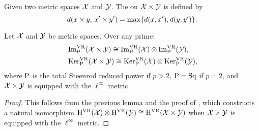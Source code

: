 \subsubsection{}

Given two metric spaces $\cX$ and $\cY$.
The  on $\cX \times \cY$ is defined by
\[
d(x \times y, \, x' \times y') = \max\set{d(x,x'), d(y,y')}.
\]

\theorem
Let $\cX$ and $\cY$ be metric spaces.
Over any prime:
\begin{align*}
	&\img^{\VR}_\rP(\cX \times \cY) \cong \img^{\VR}_\rP(\cX) \ot \img^{\VR}_\rP(\cY), \\
	&\ker^{\VR}_\rP(\cX \times \cY) \cong \ker^{\VR}_\rP(\cX) \ot \ker^{\VR}_\rP(\cY),
\end{align*}
where \(\rP\) is the total Steenrod reduced power if \(p > 2\),  \(\rP = \Sq\) if \(p = 2\), and \(\cX \times \cY\) is equipped with the \(\ell^\infty\) metric.


\begin{proof}
	This follows from the previous lemma and the proof of \cite[Thm.~6.1(1)]{lim2024vietoris}, which constructs a natural isomorphism $\rH^\VR(\cX) \ot \rH^\VR(\cY) \cong \rH^\VR(\cX \times \cY)$ when \(\cX \times \cY\) is equipped with the \(\ell^\infty\) metric.
\end{proof}